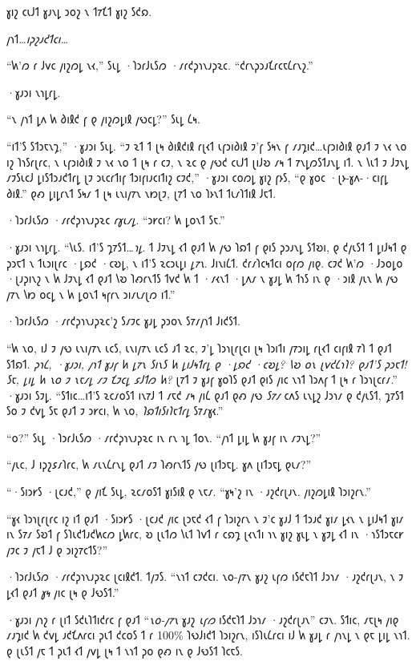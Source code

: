 𐑣𐑦𐑟 𐑤𐑧𐑓𐑑 𐑣𐑨𐑯𐑛 𐑮𐑴𐑟 𐑯 𐑑𐑳𐑗𐑑 𐑣𐑦𐑟 𐑕𐑒𐑸.

𐑢𐑪𐑑…\emph{𐑦𐑜𐑟𐑨𐑒𐑑𐑤𐑦…}

“𐑿'𐑼 𐑩 𐑓𐑫𐑤 𐑢𐑦𐑟𐑼𐑛 𐑯𐑬,” 𐑕𐑧𐑛 ·𐑐𐑮𐑩𐑓𐑧𐑕𐑼 ·𐑥𐑩𐑒𐑜𐑪𐑯𐑨𐑜𐑷𐑤. “𐑒𐑩𐑯𐑜𐑮𐑨𐑗𐑩𐑤𐑱𐑖𐑩𐑯𐑟.”

·𐑣𐑨𐑮𐑦 𐑯𐑪𐑛𐑩𐑛.

“𐑯 𐑢𐑪𐑑 𐑛𐑵 𐑿 𐑔𐑦𐑙𐑒 𐑝 𐑞 𐑢𐑦𐑟𐑼𐑛𐑦𐑙 𐑢𐑻𐑤𐑛?” 𐑕𐑧𐑛 𐑖𐑰.

“𐑦𐑑'𐑕 𐑕𐑑𐑮𐑱𐑯𐑡,” ·𐑣𐑨𐑮𐑦 𐑕𐑧𐑛. “𐑲 𐑷𐑑 𐑑 𐑚𐑰 𐑔𐑦𐑙𐑒𐑦𐑙 𐑩𐑚𐑬𐑑 𐑧𐑝𐑮𐑦𐑔𐑦𐑙 𐑲'𐑝 𐑕𐑰𐑯 𐑝 𐑥𐑨𐑡𐑦𐑒…𐑧𐑝𐑮𐑦𐑔𐑦𐑙 𐑞𐑨𐑑 𐑲 𐑯𐑬 𐑯𐑴 𐑦𐑟 𐑐𐑪𐑕𐑩𐑚𐑩𐑤, 𐑯 𐑧𐑝𐑮𐑦𐑔𐑦𐑙 𐑲 𐑯𐑬 𐑯𐑴 𐑑 𐑚𐑰 𐑩 𐑤𐑲, 𐑯 𐑷𐑤 𐑞 𐑢𐑻𐑒 𐑤𐑧𐑓𐑑 𐑚𐑦𐑓𐑹 𐑥𐑰 𐑑 𐑳𐑯𐑛𐑼𐑕𐑑𐑨𐑯𐑛 𐑦𐑑. 𐑯 𐑘𐑧𐑑 𐑲 𐑓𐑲𐑯𐑛 𐑥𐑲𐑕𐑧𐑤𐑓 𐑛𐑦𐑕𐑑𐑮𐑨𐑒𐑑𐑩𐑛 𐑚𐑲 𐑮𐑧𐑤𐑩𐑑𐑦𐑝 𐑑𐑮𐑦𐑝𐑦𐑨𐑤𐑦𐑑𐑦𐑟 𐑤𐑲𐑒,” ·𐑣𐑨𐑮𐑦 𐑤𐑴𐑼𐑛 𐑣𐑦𐑟 𐑝𐑶𐑕, “𐑞 𐑣𐑴𐑤 ·𐑚𐑶-𐑣𐑵-·𐑤𐑦𐑝𐑛 𐑔𐑦𐑙.” 𐑞𐑺 𐑛𐑦𐑛𐑩𐑯𐑑 𐑕𐑰𐑥 𐑑 𐑚𐑰 𐑧𐑯𐑦𐑢𐑳𐑯 𐑯𐑽𐑚𐑲, 𐑚𐑳𐑑 𐑯𐑴 𐑐𐑶𐑯𐑑 𐑑𐑧𐑥𐑐𐑑𐑦𐑙 𐑓𐑱𐑑.

·𐑐𐑮𐑩𐑓𐑧𐑕𐑼 ·𐑥𐑩𐑒𐑜𐑪𐑯𐑨𐑜𐑷𐑤 \emph{𐑩𐑣𐑧𐑥𐑛}. “𐑮𐑾𐑤𐑦? 𐑿 𐑛𐑴𐑯𐑑 𐑕𐑱.”

·𐑣𐑨𐑮𐑦 𐑯𐑪𐑛𐑩𐑛. “𐑘𐑧𐑕. 𐑦𐑑'𐑕 𐑡𐑳𐑕𐑑…\emph{𐑪𐑛}. 𐑑 𐑓𐑲𐑯𐑛 𐑬𐑑 𐑞𐑨𐑑 𐑿 𐑢𐑻 𐑐𐑸𐑑 𐑝 𐑞𐑦𐑕 𐑜𐑮𐑨𐑯𐑛 𐑕𐑑𐑹𐑦, 𐑞 𐑒𐑢𐑧𐑕𐑑 𐑑 𐑛𐑦𐑓𐑰𐑑 𐑞 𐑜𐑮𐑱𐑑 𐑯 𐑑𐑧𐑮𐑦𐑚𐑩𐑤 ·𐑛𐑸𐑒 ·𐑤𐑹𐑛, 𐑯 𐑦𐑑'𐑕 𐑷𐑤𐑮𐑧𐑛𐑦 \emph{𐑛𐑳𐑯}. 𐑓𐑦𐑯𐑦𐑖𐑑. 𐑒𐑩𐑥𐑐𐑤𐑰𐑑𐑤𐑦 𐑴𐑝𐑼 𐑢𐑦𐑞. 𐑤𐑲𐑒 𐑿'𐑼 ·𐑓𐑮𐑴𐑛𐑴 ·𐑚𐑨𐑜𐑦𐑯𐑟 𐑯 𐑿 𐑓𐑲𐑯𐑛 𐑬𐑑 𐑞𐑨𐑑 𐑘𐑹 𐑐𐑺𐑩𐑯𐑑𐑕 𐑑𐑫𐑒 𐑿 𐑑 ·𐑥𐑬𐑯𐑑 ·𐑛𐑵𐑥 𐑯 𐑣𐑨𐑛 𐑿 𐑑𐑪𐑕 𐑦𐑯 𐑞 ·𐑮𐑦𐑙 𐑢𐑧𐑯 𐑿 𐑢𐑻 𐑢𐑳𐑯 𐑘𐑽 𐑴𐑤𐑛 𐑯 𐑿 𐑛𐑴𐑯𐑑 𐑰𐑝𐑩𐑯 𐑮𐑦𐑥𐑧𐑥𐑚𐑼 𐑦𐑑.”

·𐑐𐑮𐑩𐑓𐑧𐑕𐑼 ·𐑥𐑩𐑒𐑜𐑪𐑯𐑨𐑜𐑷𐑤'𐑟 𐑕𐑥𐑲𐑤 𐑣𐑨𐑛 𐑜𐑮𐑴𐑯 𐑕𐑳𐑥𐑢𐑪𐑑 𐑓𐑦𐑒𐑕𐑑.

“𐑿 𐑯𐑴, 𐑦𐑓 𐑲 𐑢𐑻 𐑧𐑯𐑦𐑢𐑳𐑯 𐑧𐑤𐑕, 𐑧𐑯𐑦𐑢𐑳𐑯 𐑧𐑤𐑕 𐑨𐑑 𐑷𐑤, 𐑲'𐑛 𐑐𐑮𐑪𐑚𐑩𐑚𐑤𐑦 𐑚𐑰 𐑐𐑮𐑦𐑑𐑦 𐑢𐑳𐑮𐑦𐑛 𐑩𐑚𐑬𐑑 𐑤𐑦𐑝𐑦𐑙 𐑳𐑐 𐑑 𐑞𐑨𐑑 𐑕𐑑𐑸𐑑. \emph{𐑜𐑪𐑖, ·𐑣𐑨𐑮𐑦, 𐑢𐑪𐑑 𐑣𐑨𐑝 𐑿 𐑛𐑳𐑯 𐑕𐑦𐑯𐑕 𐑿 𐑛𐑦𐑓𐑰𐑑𐑩𐑛 𐑞 ·𐑛𐑸𐑒 ·𐑤𐑹𐑛? 𐑘𐑹 𐑴𐑯 𐑚𐑫𐑒𐑖𐑪𐑐? 𐑞𐑨𐑑'𐑕 𐑜𐑮𐑱𐑑! 𐑕𐑱, 𐑛𐑦𐑛 𐑿 𐑯𐑴 𐑲 𐑯𐑱𐑥𐑛 𐑥𐑲 𐑗𐑲𐑤𐑛 𐑭𐑓𐑑𐑼 𐑿?} 𐑚𐑳𐑑 𐑲 𐑣𐑨𐑝 𐑣𐑴𐑐𐑕 𐑞𐑨𐑑 𐑞𐑦𐑕 𐑢𐑦𐑤 𐑯𐑪𐑑 𐑐𐑮𐑵𐑝 𐑑 𐑚𐑰 𐑩 𐑐𐑮𐑪𐑚𐑤𐑩𐑥.” ·𐑣𐑨𐑮𐑦 𐑕𐑲𐑛. “𐑕𐑑𐑦𐑤…𐑦𐑑'𐑕 𐑷𐑤𐑥𐑴𐑕𐑑 𐑦𐑯𐑳𐑓 𐑑 𐑥𐑱𐑒 𐑥𐑰 𐑢𐑦𐑖 𐑞𐑨𐑑 𐑞𐑺 𐑢𐑻 \emph{𐑕𐑳𐑥} 𐑤𐑵𐑕 𐑧𐑯𐑛𐑟 𐑓𐑮𐑪𐑥 𐑞 𐑒𐑢𐑧𐑕𐑑, 𐑡𐑳𐑕𐑑 𐑕𐑴 𐑲 𐑒𐑫𐑛 𐑕𐑱 𐑞𐑨𐑑 𐑲 𐑮𐑾𐑤𐑦, 𐑿 𐑯𐑴, \emph{𐑐𐑸𐑑𐑦𐑕𐑦𐑐𐑱𐑑𐑩𐑛} 𐑕𐑳𐑥𐑣𐑬.”

“𐑴?” 𐑕𐑧𐑛 ·𐑐𐑮𐑩𐑓𐑧𐑕𐑼 ·𐑥𐑩𐑒𐑜𐑪𐑯𐑨𐑜𐑷𐑤 𐑦𐑯 𐑩𐑯 𐑪𐑛 𐑑𐑴𐑯. “𐑢𐑪𐑑 𐑛𐑦𐑛 𐑿 𐑣𐑨𐑝 𐑦𐑯 𐑥𐑲𐑯𐑛?”

“𐑢𐑧𐑤, 𐑓 𐑦𐑜𐑟𐑭𐑥𐑐𐑩𐑤, 𐑿 𐑥𐑧𐑯𐑖𐑩𐑯𐑛 𐑞𐑨𐑑 𐑥𐑲 𐑐𐑺𐑩𐑯𐑑𐑕 𐑢𐑻 𐑚𐑦𐑑𐑮𐑱𐑛. 𐑣𐑵 𐑚𐑦𐑑𐑮𐑱𐑛 𐑞𐑧𐑥?”

“·𐑕𐑦𐑮𐑾𐑕 ·𐑚𐑤𐑨𐑒,” 𐑞 𐑢𐑦𐑗 𐑕𐑧𐑛, 𐑷𐑤𐑥𐑴𐑕𐑑 𐑣𐑦𐑕𐑦𐑙 𐑞 𐑯𐑱𐑥. “𐑣𐑰'𐑟 𐑦𐑯 ·𐑨𐑟𐑒𐑩𐑚𐑨𐑯. 𐑢𐑦𐑟𐑼𐑛𐑦𐑙 𐑐𐑮𐑦𐑟𐑩𐑯.”

“𐑣𐑬 𐑐𐑮𐑪𐑚𐑩𐑚𐑩𐑤 𐑦𐑟 𐑦𐑑 𐑞𐑨𐑑 ·𐑕𐑦𐑮𐑾𐑕 ·𐑚𐑤𐑨𐑒 𐑢𐑦𐑤 𐑚𐑮𐑱𐑒 𐑬𐑑 𐑝 𐑐𐑮𐑦𐑟𐑩𐑯 𐑯 𐑲'𐑤 𐑣𐑨𐑓 𐑑 𐑑𐑮𐑨𐑒 𐑣𐑦𐑥 𐑛𐑬𐑯 𐑯 𐑛𐑦𐑓𐑰𐑑 𐑣𐑦𐑥 𐑦𐑯 𐑕𐑳𐑥 𐑕𐑹𐑑 𐑝 𐑕𐑐𐑧𐑒𐑑𐑨𐑒𐑿𐑤𐑼 𐑛𐑿𐑩𐑤, 𐑹 𐑚𐑧𐑑𐑼 𐑘𐑧𐑑 𐑐𐑫𐑑 𐑩 𐑤𐑸𐑡 𐑚𐑬𐑯𐑑𐑦 𐑪𐑯 𐑣𐑦𐑟 𐑣𐑧𐑛 𐑯 𐑣𐑲𐑛 𐑬𐑑 𐑦𐑯 ·𐑪𐑕𐑑𐑮𐑱𐑤𐑾 𐑢𐑲𐑤 𐑲 𐑢𐑱𐑑 𐑓 𐑞 𐑮𐑦𐑟𐑳𐑤𐑑𐑕?”

·𐑐𐑮𐑩𐑓𐑧𐑕𐑼 ·𐑥𐑩𐑒𐑜𐑪𐑯𐑨𐑜𐑷𐑤 𐑚𐑤𐑦𐑙𐑒𐑑. 𐑑𐑢𐑲𐑕. “𐑯𐑪𐑑 𐑤𐑲𐑒𐑤𐑦. 𐑯𐑴-𐑢𐑳𐑯 𐑣𐑨𐑟 𐑧𐑝𐑼 𐑦𐑕𐑒𐑱𐑐𐑑 𐑓𐑮𐑪𐑥 ·𐑨𐑟𐑒𐑩𐑚𐑨𐑯, 𐑯 𐑲 𐑛𐑬𐑑 𐑞𐑨𐑑 \emph{𐑣𐑰} 𐑢𐑦𐑤 𐑚𐑰 𐑞 𐑓𐑻𐑕𐑑.”

·𐑣𐑨𐑮𐑦 𐑢𐑪𐑟 𐑩 𐑚𐑦𐑑 𐑕𐑒𐑧𐑐𐑑𐑦𐑒𐑩𐑤 𐑝 𐑞𐑨𐑑 “\emph{𐑯𐑴-𐑢𐑳𐑯} 𐑣𐑨𐑟 \emph{𐑧𐑝𐑼} 𐑦𐑕𐑒𐑱𐑐𐑑 𐑓𐑮𐑪𐑥 ·𐑨𐑟𐑒𐑩𐑚𐑨𐑯” 𐑤𐑲𐑯. 𐑕𐑑𐑦𐑤, 𐑥𐑱𐑚𐑰 𐑢𐑦𐑞 𐑥𐑨𐑡𐑦𐑒 𐑿 𐑒𐑫𐑛 𐑨𐑒𐑗𐑵𐑩𐑤𐑦 𐑜𐑧𐑑 𐑒𐑤𐑴𐑕 𐑑 𐑩 100\% 𐑐𐑻𐑓𐑦𐑒𐑑 𐑐𐑮𐑦𐑟𐑩𐑯, 𐑦𐑕𐑐𐑧𐑖𐑩𐑤𐑦 𐑦𐑓 𐑿 𐑣𐑨𐑛 𐑩 𐑢𐑪𐑯𐑛 𐑯 𐑞𐑱 𐑛𐑦𐑛 𐑯𐑪𐑑. 𐑞 𐑚𐑧𐑕𐑑 𐑢𐑱 𐑑 𐑜𐑧𐑑 𐑬𐑑 𐑢𐑫𐑛 𐑚𐑰 𐑑 𐑯𐑪𐑑 𐑜𐑴 𐑞𐑺 𐑦𐑯 𐑞 𐑓𐑻𐑕𐑑 𐑐𐑤𐑱𐑕.

